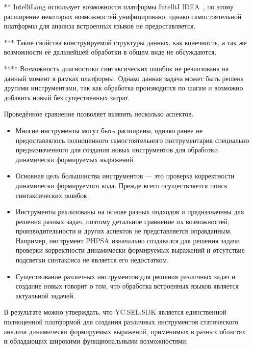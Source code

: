 \begin{table} [htbp]
\begin{threeparttable}
\begin{tablenotes}
            \item[**] \small{IntelliLang использует возможности платформы IntelliJ IDEA~\cite{IDEA}, по этому расширение некоторых возможностей унифицировано, однако самостоятельной платформы для анализа встроенных языков не предоставляется.}
            \item[***] \small{Такие свойства конструируемой структуры данных, как конечность, а так же возможности её дальнейшей обработки в общем виде не обсуждаются.}
            \item[****] \small{Возможность диагностики синтаксических ошибок не реализована на данный момент в рамках платформы. Однако данная задача может быть решена другими инструментами, так как обработка производится по шагам и возможно добавить новый без существенных затрат.}
  \end{tablenotes}
  \end{threeparttable}
\end{table}

Проведённое сравнение позволяет выявить несколько аспектов.
\begin{itemize}
    \item Многие инструменты могут быть расширены, однако ранее не предоставлялось полноценного самостоятельного инструментария специально предназначенного для создания новых инструментов для обработки динамически формируемых выражений.
    \item Основная цель большинства инструментов --- это проверка корректности динамически формируемого кода. Прежде всего осуществляется поиск синтаксических ошибок.
    \item Инструменты реализованы на основе разных подходов и предназначены для решения разных задач, поэтому детальное сравнение их возможностей, производительности и других аспектов не представляется оправданным. Например, инструмент PHPSA изначально создавался для решения задачи проверки корректности динамически формируемых выражений и отсутствие подсветки синтаксиса не является его недостатком.
    \item Существование различных инструментов для решения различных задач и создание новых говорит о том, что обработка встроенных языков является актуальной задачей.
\end{itemize}

В результате можно утверждать, что YC.SEL.SDK является единственной полноценной платформой для создания различных инструментов статического анализа динамически формируемых выражений, применимых в разных областях и обладающих широкими функциональными возможностями.


